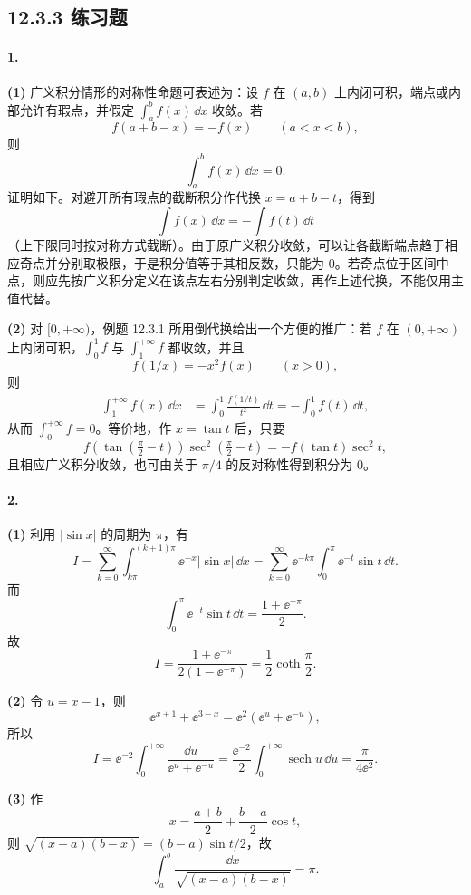 \subsection*{12.3.3 练习题}

\paragraph{1.}
\textbf{(1)} 广义积分情形的对称性命题可表述为：设 $f$ 在 $(a,b)$ 上内闭可积，端点或内部允许有瑕点，并假定 $\int_a^b f(x)\,\dd x$ 收敛。若
\[
  f(a+b-x)=-f(x)\qquad(a<x<b),
\]
则
\[
  \int_a^b f(x)\,\dd x=0.
\]
证明如下。对避开所有瑕点的截断积分作代换 $x=a+b-t$，得到
\[
  \int f(x)\,\dd x=-\int f(t)\,\dd t
\]
（上下限同时按对称方式截断）。由于原广义积分收敛，可以让各截断端点趋于相应奇点并分别取极限，于是积分值等于其相反数，只能为 $0$。若奇点位于区间中点，则应先按广义积分定义在该点左右分别判定收敛，再作上述代换，不能仅用主值代替。

\textbf{(2)} 对 $[0,+\infty)$，例题 12.3.1 所用倒代换给出一个方便的推广：若 $f$ 在 $(0,+\infty)$ 上内闭可积，$\int_0^1f$ 与 $\int_1^{+\infty}f$ 都收敛，并且
\[
  f(1/x)=-x^2f(x)\qquad(x>0),
\]
则
\begin{align*}
  \int_1^{+\infty}f(x)\,\dd x
  &=\int_0^1\frac{f(1/t)}{t^2}\,\dd t
  =-\int_0^1f(t)\,\dd t,
\end{align*}
从而 $\int_0^{+\infty}f=0$。等价地，作 $x=\tan t$ 后，只要
\[
  f(\tan(\tfrac\pi2-t))\sec^2(\tfrac\pi2-t)
  =-f(\tan t)\sec^2t,
\]
且相应广义积分收敛，也可由关于 $\pi/4$ 的反对称性得到积分为 $0$。

\paragraph{2.}
\textbf{(1)} 利用 $|\sin x|$ 的周期为 $\pi$，有
\[
  I=\sum_{k=0}^{\infty}\int_{k\pi}^{(k+1)\pi}\ee^{-x}|\sin x|\,\dd x
  =\sum_{k=0}^{\infty}\ee^{-k\pi}\int_0^\pi\ee^{-t}\sin t\,\dd t.
\]
而
\[
  \int_0^\pi\ee^{-t}\sin t\,\dd t=\frac{1+\ee^{-\pi}}2.
\]
故
\[
  \boxed{I=\frac{1+\ee^{-\pi}}{2(1-\ee^{-\pi})}
  =\frac12\operatorname{coth}\frac\pi2.}
\]

\textbf{(2)} 令 $u=x-1$，则
\[
  \ee^{x+1}+\ee^{3-x}=\ee^2(\ee^u+\ee^{-u}),
\]
所以
\[
  I=\ee^{-2}\int_0^{+\infty}\frac{\dd u}{\ee^u+\ee^{-u}}
  =\frac{\ee^{-2}}2\int_0^{+\infty}\operatorname{sech}u\,\dd u
  =\boxed{\frac\pi{4\ee^2}}.
\]

\textbf{(3)} 作
\[
  x=\frac{a+b}2+\frac{b-a}2\cos t,
\]
则 $\sqrt{(x-a)(b-x)}=(b-a)\sin t/2$，故
\[
  \boxed{\int_a^b\frac{\dd x}{\sqrt{(x-a)(b-x)}}=\pi.}
\]

